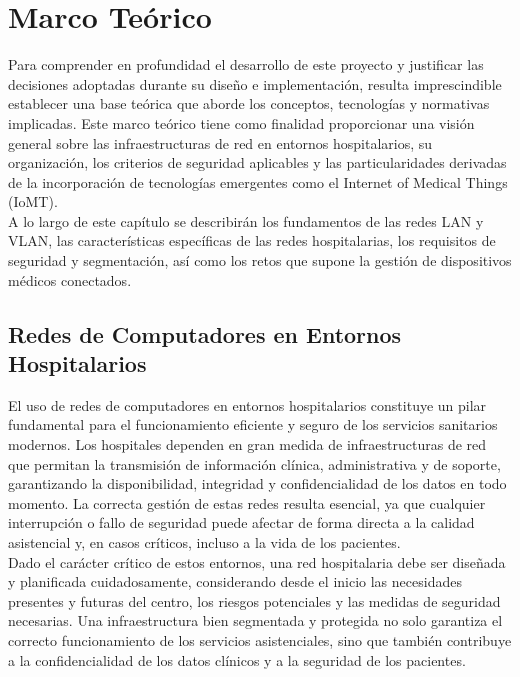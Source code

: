 
\chapter{Marco Teórico}\label{MarcoTeórico}
Para comprender en profundidad el desarrollo de este proyecto y justificar las decisiones adoptadas durante su diseño e implementación, resulta imprescindible establecer 
una base teórica que aborde los conceptos, tecnologías y normativas implicadas. Este marco teórico tiene como finalidad proporcionar una visión general sobre las 
infraestructuras de red en entornos hospitalarios, su organización, los criterios de seguridad aplicables y las particularidades derivadas de la incorporación de tecnologías 
emergentes como el Internet of Medical Things (IoMT).\\

A lo largo de este capítulo se describirán los fundamentos de las redes LAN y VLAN, las características específicas de las redes hospitalarias, los requisitos de seguridad y 
segmentación, así como los retos que supone la gestión de dispositivos médicos conectados.

\section{Redes de Computadores en Entornos Hospitalarios}
El uso de redes de computadores en entornos hospitalarios constituye un pilar fundamental para el funcionamiento eficiente y seguro de los servicios sanitarios modernos. 
Los hospitales dependen en gran medida de infraestructuras de red que permitan la transmisión de información clínica, administrativa y de soporte, garantizando la 
disponibilidad, integridad y confidencialidad de los datos en todo momento. La correcta gestión de estas redes resulta esencial, ya que cualquier interrupción o fallo 
de seguridad puede afectar de forma directa a la calidad asistencial y, en casos críticos, incluso a la vida de los pacientes.\\

Dado el carácter crítico de estos entornos, una red hospitalaria debe ser diseñada y planificada cuidadosamente, considerando desde el inicio las necesidades presentes y 
futuras del centro, los riesgos potenciales y las medidas de seguridad necesarias. Una infraestructura bien segmentada y protegida no solo garantiza el correcto 
funcionamiento de los servicios asistenciales, sino que también contribuye a la confidencialidad de los datos clínicos y a la seguridad de los pacientes.\\

